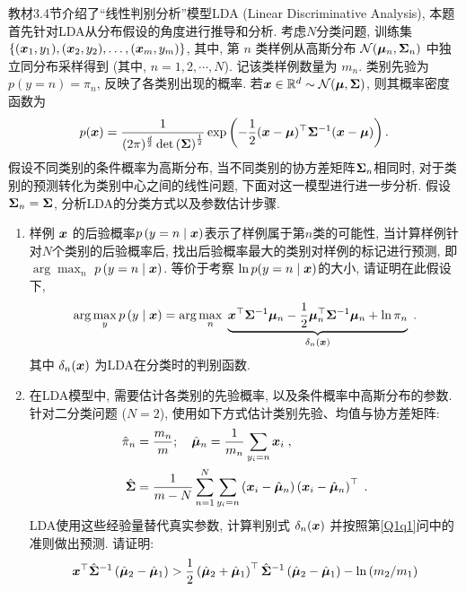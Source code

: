 \documentclass[answers]{exam}  %
\begin{document}
\begin{questions}
教材3.4节介绍了“线性判别分析”模型LDA (Linear Discriminative Analysis), 本题首先针对LDA从分布假设的角度进行推导和分析.
考虑$N$分类问题, 训练集 $\left\{({\boldsymbol{x}}_1,y_1),({\boldsymbol{x}}_2,y_2),\ldots,({\boldsymbol{x}}_m,y_m)\right\}$, 其中, 第 $n$ 类样例从高斯分布 $\mathcal{N}(\boldsymbol{\mu}_n,\boldsymbol{\Sigma}_n)$ 中独立同分布采样得到 (其中, $n=1,2,\cdots,N$). 记该类样例数量为 $m_n$. 类别先验为 $p\left(y=n\right)=\pi_n$, 反映了各类别出现的概率. 若${\boldsymbol{x}}\in \mathbb{R}^d \sim \mathcal{N}(\boldsymbol{\mu},\boldsymbol{\Sigma})$, 则其概率密度函数为
\begin{align}
	p({\boldsymbol{x}})=\frac{1}{(2\pi)^{\frac{d}{2}}\det\left(\boldsymbol{\Sigma}\right)^\frac{1}{2}}\exp\left(-\frac{1}{2}({\boldsymbol{x}}-\boldsymbol{\mu})^\top\boldsymbol{\Sigma}^{-1}({\boldsymbol{x}}-\boldsymbol{\mu})\right).
\end{align}
假设不同类别的条件概率为高斯分布, 当不同类别的协方差矩阵$\boldsymbol{\Sigma}_n$相同时, 对于类别的预测转化为类别中心之间的线性问题, %
下面对这一模型进行进一步分析.
假设$\boldsymbol{\Sigma}_n = \boldsymbol{\Sigma}$, 分析LDA的分类方式以及参数估计步骤.
\begin{enumerate}
	\item \label{Q1q1}样例 ${\boldsymbol{x}}$ 的后验概率$p\left(y=n\mid {\boldsymbol{x}}\right)$表示了样例属于第$n$类的可能性, 当计算样例针对$N$个类别的后验概率后, 找出后验概率最大的类别对样例的标记进行预测, 即 $\arg\max_n$ $p\left(y=n\mid {\boldsymbol{x}}\right)$. 等价于考察 $\ln p(y=n\mid {\boldsymbol{x}})$的大小,  请证明在此假设下, 
	\begin{equation}
	\arg\max_y p\left(y\mid {\boldsymbol{x}}\right)=\arg\max_n\; \underbrace{{\boldsymbol{x}}^{\top} \boldsymbol{\Sigma}^{-1} \boldsymbol{\mu}_{n}-\frac{1}{2} \boldsymbol{\mu}_{n}^{\top} \boldsymbol{\Sigma}^{-1} \boldsymbol{\mu}_{n}+\ln \pi_{n}}_{\delta_n({\boldsymbol{x}})}    \;.
	\end{equation}
	其中 $\delta_{n}({\boldsymbol{x}})$ 为LDA在分类时的判别函数. 
	\item \label{Q1q2} 在LDA模型中, 需要估计各类别的先验概率, 以及条件概率中高斯分布的参数. 针对二分类问题 ($N=2$), 使用如下方式估计类别先验、均值与协方差矩阵: 
	\begin{align}
	    \hat{\pi}_{n}&=\frac{m_n}{m}; \quad
	    \hat{\boldsymbol{\mu}}_{n}=\frac{1}{m_n}\sum_{y_{i}=n} {\boldsymbol{x}}_{i}\;,\\
	    \hat{\boldsymbol{\Sigma}}&=\frac{1}{m-N}\sum_{n=1}^{N} \sum_{y_{i}=n}\left({\boldsymbol{x}}_{i}-\hat{\boldsymbol{\mu}}_{n}\right)\left({\boldsymbol{x}}_{i}-\hat{\boldsymbol{\mu}}_{n}\right)^{\top}\;.
	\end{align}
	LDA使用这些经验量替代真实参数, 计算判别式 $\delta_n({\boldsymbol{x}})$ 并按照第\ref{Q1q1}问中的准则做出预测. 请证明:
	\begin{equation}
	    \vx^{\top} \hat{\mSigma}^{-1}\left(\hat{\vmu}_{2}-\hat{\vmu}_{1}\right)>\frac{1}{2}\left(\hat{\vmu}_{2}+\hat{\vmu}_{1}\right)^{\top} \hat{\mSigma}^{-1}\left(\hat{\vmu}_{2}-\hat{\vmu}_{1}\right)-\ln \left(m_{2} / m_{1}\right)

\end{equation}
\end{enumerate}
\end{questions}
\end{document}
